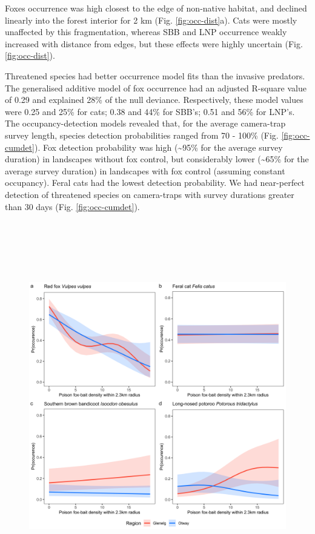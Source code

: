 \documentclass[11pt,a4paper,titlepage,twoside,openright]{style/unimelbthesis}
\begin{document}
\begin{mainmatter}
Foxes occurrence was high closest to the edge of non-native habitat, and declined linearly into the forest interior for 2 km (Fig. \ref{fig:occ-dist}a). Cats were mostly unaffected by this fragmentation, whereas SBB and LNP occurrence weakly increased with distance from edges, but these effects were highly uncertain (Fig. \ref{fig:occ-dist}).

Threatened species had better occurrence model fits than the invasive predators. The generalised additive model of fox occurrence had an adjusted R-square value of 0.29 and explained 28\% of the null deviance. Respectively, these model values were 0.25 and 25\% for cats; 0.38 and 44\% for SBB's; 0.51 and 56\% for LNP's. The occupancy-detection models revealed that, for the average camera-trap survey length, species detection probabilities ranged from 70 - 100\% (Fig. \ref{fig:occ-cumdet}). Fox detection probability was high (\textasciitilde95\% for the average survey duration) in landscapes without fox control, but considerably lower (\textasciitilde65\% for the average survey duration) in landscapes with fox control (assuming constant occupancy). Feral cats had the lowest detection probability. We had near-perfect detection of threatened species on camera-traps with survey durations greater than 30 days (Fig. \ref{fig:occ-cumdet}).

\newpage

\(~\)

\(~\)

\(~\)
\begin{figure}

{\centering \includegraphics[width=1\linewidth]{figure/c1/foxbaits} 

}
\end{figure}
\end{mainmatter}
\end{document}
